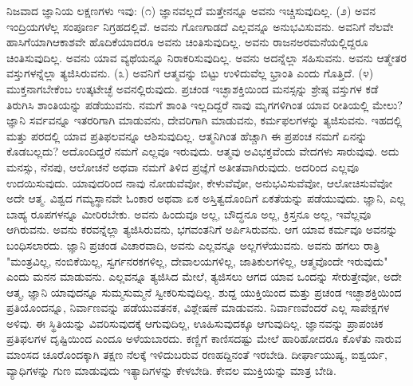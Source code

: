 ನಿಜವಾದ ಜ್ಞಾನಿಯ ಲಕ್ಷಣಗಳು ಇವು: (೧) ಜ್ಞಾನವಲ್ಲದೆ ಮತ್ತೇನನ್ನೂ ಅವನು ಇಚ್ಚಿಸುವುದಿಲ್ಲ. (೨) ಅವನ ಇಂದ್ರಿಯಗಳೆಲ್ಲ ಸಂಪೂರ್ಣ ನಿಗ್ರಹದಲ್ಲಿವೆ. ಅವನು ಗೊಣಗಾಡದೆ ಎಲ್ಲವನ್ನೂ ಅನುಭವಿಸುವನು. ಅವನಿಗೆ ನೆಲವೇ ಹಾಸಿಗೆಯಾಗಿ\break ಆಕಾಶವೇ ಹೊದಿಕೆಯಾದರೂ ಅವನು ಚಿಂತಿಸುವುದಿಲ್ಲ. ಅವನು ರಾಜನ\break ಅರಮನೆಯಲ್ಲಿದ್ದರೂ ಚಿಂತಿಸುವುದಿಲ್ಲ. ಅವನು ಯಾವ ವ್ಯಥೆಯನ್ನೂ ನಿರಾಕರಿಸುವುದಿಲ್ಲ. ಅವನು ಅದನ್ನೆಲ್ಲಾ ಸಹಿಸುವನು. ಅವನು ಆತ್ಮೇತರ ವಸ್ತುಗಳನ್ನೆಲ್ಲಾ ತ್ಯಜಿಸಿರುವನು. (೩) ಅವನಿಗೆ ಆತ್ಮವನ್ನು ಬಿಟ್ಟು ಉಳಿದುವೆಲ್ಲ ಭ್ರಾಂತಿ ಎಂದು ಗೊತ್ತಿದೆ. (೪) ಮುಕ್ತನಾಗಬೇಕೆಂಬ ಉತ್ಕಟೇಚ್ಛೆ ಅವನಲ್ಲಿರುವುದು. ಪ್ರಚಂಡ ಇಚ್ಛಾಶಕ್ತಿಯಿಂದ ಮನಸ್ಸನ್ನು ಶ್ರೇಷ್ಠ ವಸ್ತುಗಳ ಕಡೆ ತಿರುಗಿಸಿ ಶಾಂತಿಯನ್ನು ಪಡೆಯುವನು. ನಮಗೆ ಶಾಂತಿ ಇಲ್ಲದಿದ್ದರೆ ನಾವು ಮೃಗಗಳಿಗಿಂತ ಯಾವ ರೀತಿಯಲ್ಲಿ ಮೇಲು? ಜ್ಞಾನಿ ಸರ್ವವನ್ನೂ ಇತರರಿಗಾಗಿ ಮಾಡುವನು, ದೇವರಿಗಾಗಿ ಮಾಡುವನು, ಕರ್ಮಫಲಗಳನ್ನು ತ್ಯಜಿಸುವನು. ಇಹದಲ್ಲಿ ಮತ್ತು ಪರದಲ್ಲಿ ಯಾವ ಪ್ರತಿಫಲವನ್ನೂ ಆಶಿಸುವುದಿಲ್ಲ. ಆತ್ಮನಿಗಿಂತ ಹೆಚ್ಚಾಗಿ ಈ ಪ್ರಪಂಚ ನಮಗೆ ಏನನ್ನು ಕೊಡಬಲ್ಲದು? ಅದೊಂದಿದ್ದರೆ ನಮಗೆ ಎಲ್ಲವೂ ಇರುವುದು. ಆತ್ಮವು ಅವಿಭಕ್ತವೆಂದು ವೇದಗಳು ಸಾರುವುವು. ಅದು ಮನಸ್ಸು, ನೆನಪು, ಆಲೋಚನೆ ಅಥವಾ ನಮಗೆ ತಿಳಿದ ಪ್ರಜ್ಞೆಗೆ ಅತೀತವಾಗಿರುವುದು. ಅದರಿಂದ ಎಲ್ಲವೂ ಉದಯಿಸುವುದು. ಯಾವುದರಿಂದ ನಾವು ನೋಡುವೆವೋ, ಕೇಳುವೆವೋ, ಅನುಭವಿಸುವೆವೋ, ಆಲೋಚಿಸುವೆವೋ ಅದೇ ಆತ್ಮ. ವಿಶ್ವದ ಗಮ್ಯಸ್ಥಾನವೇ ಓಂಕಾರ ಅಥವಾ ಏಕ ಅಸ್ತಿತ್ವದೊಂದಿಗೆ ಏಕತೆಯನ್ನು ಪಡೆಯುವುದು. ಜ್ಞಾನಿ, ಎಲ್ಲ ಬಾಹ್ಯ ರೂಪಗಳನ್ನೂ ಮೀರಿರಬೇಕು. ಅವನು ಹಿಂದುವೂ ಅಲ್ಲ, ಬೌದ್ಧನೂ ಅಲ್ಲ, ಕ್ರಿಸ್ತನೂ ಅಲ್ಲ, ಇವೆಲ್ಲವೂ ಆಗಿರುವನು. ಅವನು ಕರವನ್ನೆಲ್ಲಾ ತ್ಯಜಿಸಿರುವನು, ಭಗವಂತನಿಗೆ ಅರ್ಪಿಸಿರುವನು. ಆಗ ಯಾವ ಕರ್ಮವೂ ಅವನನ್ನು ಬಂಧಿಸಲಾರದು. ಜ್ಞಾನಿ ಪ್ರಚಂಡ ವಿಚಾರವಾದಿ, ಅವನು ಎಲ್ಲವನ್ನೂ ಅಲ್ಲಗಳೆಯುವನು. ಅವನು ಹಗಲು ರಾತ್ರಿ "ಮಂತ್ರವಿಲ್ಲ, ನಂಬಿಕೆಯಿಲ್ಲ, ಸ್ವರ್ಗನರಕಗಳಿಲ್ಲ, ದೇವಾಲಯಗಳಿಲ್ಲ, ಜಾತಿಕುಲಗಳಿಲ್ಲ, ಆತ್ಮವೊಂದೇ ಇರುವುದು" ಎಂದು ಮನನ ಮಾಡುವನು. ಎಲ್ಲವನ್ನೂ ತ್ಯಜಿಸಿದ ಮೇಲೆ, ತ್ಯಜಿಸಲು ಆಗದ ಯಾವ ಒಂದನ್ನು ಸೇರುತ್ತೇವೋ, ಅದೇ ಆತ್ಮ, ಜ್ಞಾನಿ ಯಾವುದನ್ನೂ ಸುಮ್ಮಸುಮ್ಮನೆ ಸ್ವೀಕರಿಸುವುದಿಲ್ಲ. ಶುದ್ದ ಯುಕ್ತಿಯಿಂದ ಮತ್ತು ಪ್ರಚಂಡ ಇಚ್ಛಾಶಕ್ತಿಯಿಂದ ಪ್ರತಿಯೊಂದನ್ನೂ, ನಿರ್ವಾಣವನ್ನು ಪಡೆಯುವತನಕ, ವಿಶ್ಲೇಷಣೆ ಮಾಡುವನು. ನಿರ್ವಾಣವೆಂದರೆ ಎಲ್ಲ ಸಾಪೇಕ್ಷಗಳ ಅಳಿವು. ಈ ಸ್ಥಿತಿಯನ್ನು ವಿವರಿಸುವುದಕ್ಕೆ ಆಗುವುದಿಲ್ಲ, ಊಹಿಸುವುದಕ್ಕೂ ಆಗುವುದಿಲ್ಲ. ಜ್ಞಾನವನ್ನು ಪ್ರಾಪಂಚಿಕ ಪ್ರತಿಫಲಗಳ ದೃಷ್ಟಿಯಿಂದ ಎಂದೂ ಅಳೆಯಬಾರದು. ಕಣ್ಣಿಗೆ ಕಾಣಿಸದಷ್ಟು ಮೇಲೆ ಹಾರಿಹೋದರೂ ಕೊಳೆತು ನಾರುವ ಮಾಂಸದ ಚೂರೊಂದಕ್ಕಾಗಿ ತಕ್ಷಣ ನೆಲಕ್ಕೆ ಇಳಿದುಬರುವ ರಣಹದ್ದಿನಂತೆ ಇರಬೇಡಿ. ದೀರ್ಘಾಯುಷ್ಯ, ಐಶ್ವರ್ಯ, ವ್ಯಾಧಿಗಳನ್ನು ಗುಣ ಮಾಡುವುದು ಇತ್ಯಾದಿಗಳನ್ನು ಕೇಳಬೇಡಿ. ಕೇವಲ ಮುಕ್ತಿಯನ್ನು ಮಾತ್ರ ಬೇಡಿ.

